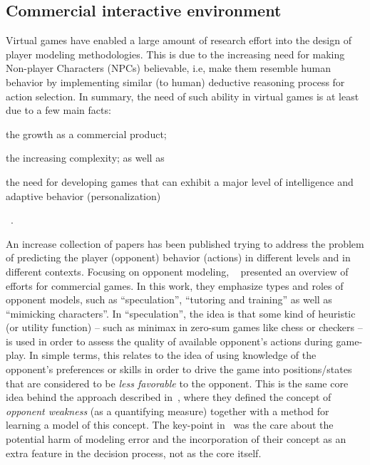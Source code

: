 \subsection{Commercial interactive environment}

Virtual games have enabled a large amount of research effort into the design of player modeling methodologies. This is due to the increasing need for making Non-player Characters (NPCs) believable, i.e, make them resemble human behavior by implementing similar (to human) deductive reasoning process for action selection.  In summary, the need of such ability in virtual games is at least due to a few main facts: \begin{inparaenum}\item the growth as a commercial product; \item the increasing complexity; as well as \item the need for developing games that can exhibit a major level of intelligence and adaptive behavior (personalization)\end{inparaenum}~\cite{bakkes2012personalised}. 

An increase collection of papers has been published trying to address the problem of predicting the player (opponent) behavior (actions) in different levels and in different contexts. Focusing on opponent modeling, ~\cite{Herik_opponentmodelling} presented an overview of efforts for commercial games. In this work, they emphasize types and roles of opponent models, such as ``speculation'', ``tutoring and training'' as well as ``mimicking characters''. In ``speculation'', the idea is that some kind of heuristic (or utility function) -- such as minimax in zero-sum games like chess or checkers -- is used in order to assess the quality of available opponent's actions during game-play. In simple terms, this relates to the idea of using knowledge of the opponent's preferences or skills in order to drive the game into positions/states that are considered to be \textit{less favorable} to the opponent. This is the same core idea behind the approach described in~\cite{markovitch2005learning}, where they defined the concept of \textit{opponent weakness} (as a quantifying measure) together with a method for learning a model of this concept. The key-point in~\cite{markovitch2005learning} was the care about the potential harm of modeling error and the incorporation of their concept as an extra feature in the decision process, not as the core itself.

